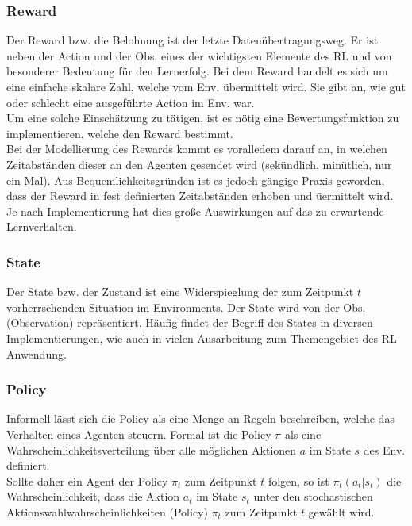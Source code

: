 \subsubsection{Reward}\label{sec:Reward}
Der Reward bzw. die Belohnung ist der letzte Datenübertragungsweg. Er ist neben der Action und der Obs. eines der wichtigsten Elemente des RL und von besonderer Bedeutung für den Lernerfolg.
Bei dem Reward handelt es sich um eine einfache skalare Zahl, welche vom Env. übermittelt wird. Sie gibt an, wie gut oder schlecht eine ausgeführte Action im Env. war. \cite[S. 42]{Sutton1998}\\
Um eine solche Einschätzung zu tätigen, ist es nötig eine Bewertungsfunktion zu implementieren, welche den Reward bestimmt.\\ 
Bei der Modellierung des Rewards kommt es voralledem darauf an, in welchen Zeitabständen dieser an den Agenten gesendet wird (sekündlich, minütlich, nur ein Mal). Aus Bequemlichkeitsgründen ist es jedoch gängige Praxis geworden, dass der Reward in fest definierten Zeitabständen erhoben und üermittelt wird. \cite[S. 29 f.]{DRL_Lapan}\\
Je nach Implementierung hat dies große Auswirkungen auf das zu erwartende Lernverhalten.

\subsubsection{State}\label{sec:State}
Der State bzw. der Zustand ist eine Widerspieglung der zum Zeitpunkt $t$ vorherrschenden Situation im Environments. 
Der State wird von der Obs. (Observation) repräsentiert. Häufig findet der Begriff des States in diversen Implementierungen, wie auch in vielen Ausarbeitung zum Themengebiet des RL Anwendung. \cite[s. 381 ff.]{Sutton1998}

\subsubsection{Policy} \label{sec:Policy}
Informell lässt sich die Policy als eine Menge an Regeln beschreiben, welche das Verhalten eines Agenten steuern. Formal ist die Policy $\pi$ als eine Wahrscheinlichkeitsverteilung über alle möglichen Aktionen $a$ im State $s$ des Env. definiert. \cite[S. 44]{DRL_Lapan}\\
Sollte daher ein Agent der Policy $\pi_{t}$ zum Zeitpunkt $t$ folgen, so ist $\pi_{t}(a_t|s_t)$ die Wahrscheinlichkeit, dass die Aktion $a_t$ im State $s_t$ unter den stochastischen Aktionswahlwahrscheinlichkeiten (Policy) $\pi_{t}$ zum Zeitpunkt $t$ gewählt wird. 
\cite[S. 45 ff.]{Sutton1998}

